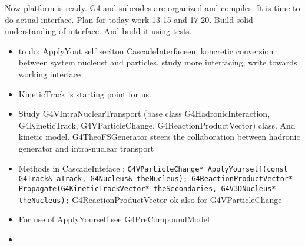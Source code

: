 Now platform is ready. G4 and subcodes are organized and compiles. It
is time to do actual interface.  Plan for today work 13-15 and 17-20.
Build solid understanding of interface. And build it using tests.
\begin{itemize}
\item to do: ApplyYout self seciton CascadeInterfaceen, koncretic
  conversion between system nucleust and particles, study more
  interfacing, write towards working interface
\item KineticTrack is starting point for us.
\item Study G4VIntraNuclearTransport (base class
  G4HadronicInteraction, G4KineticTrack, G4VParticleChange,
  G4ReactionProductVector) class. And kinetic model. G4TheoFSGenerator
  steers the collaboration between hadronic generator and
  intra-nuclear transport
\item Methods in CascadeInteface : {\tt G4VParticleChange*
    ApplyYourself(const G4Track\& aTrack, G4Nucleus\& theNucleus);
    G4ReactionProductVector* Propagate(G4KineticTrackVector*
    theSecondaries, G4V3DNucleus* theNucleus);}
  G4ReactionProductVector ok also for G4VParticleChange
\item For use of ApplyYourself see G4PreCompoundModel
\item
\end{itemize}


